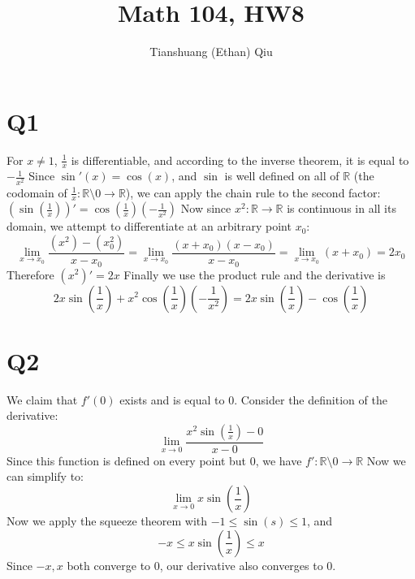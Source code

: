 \documentclass[12pt]{article}
\author{Tianshuang (Ethan) Qiu}
\newcommand{\R}{\mathbb{R}}
\begin{document}
\title{Math 104, HW8}
\maketitle
\newpage

\section{Q1}
For $x \not = 1$, $\frac{1}{x}$ is differentiable, and according to the inverse theorem, it is equal to $-\frac{1}{x^2}$
\newline
Since $\sin'(x) = \cos(x)$, and $\sin$ is well defined on all of $\R$ (the codomain of $\frac{1}{x}: \R \setminus 0 \to \R$), we can apply the chain rule to the second factor: $(\sin(\frac{1}{x}))' = \cos(\frac{1}{x})(-\frac{1}{x^2})$
\newline
Now since $x^2: \R \to \R$ is continuous in all its domain, we attempt to differentiate at an arbitrary point $x_0$:
$$\lim_{x \to x_0}\frac{(x^2)-(x_0^2)}{x-x_0} = \lim_{x \to x_0}\frac{(x+x_0)(x-x_0)}{x-x_0} = \lim_{x \to x_0}(x+x_0) = 2x_0$$
Therefore $(x^2)'=2x$
\newline
Finally we use the product rule and the derivative is $$2x\sin(\frac{1}{x}) + x^2\cos(\frac{1}{x})(-\frac{1}{x^2})= 2x\sin(\frac{1}{x})-\cos(\frac{1}{x})$$
\newpage


\section{Q2}
We claim that $f'(0)$ exists and is equal to $0$.
\newline
Consider the definition of the derivative: $$\lim_{x \to 0}\frac{x^2\sin(\frac{1}{x})-0}{x-0}$$
Since this function is defined on every point but 0, we have $f': \R \setminus 0 \to \R$
Now we can simplify to:
$$\lim_{x \to 0}x \sin(\frac{1}{x}) $$
Now we apply the squeeze theorem with $-1 \leq \sin(s) \leq 1$, and
$$-x \leq x \sin(\frac{1}{x}) \leq x$$
Since $-x, x$ both converge to 0, our derivative also converges to 0.
\newpage
\end{document}
